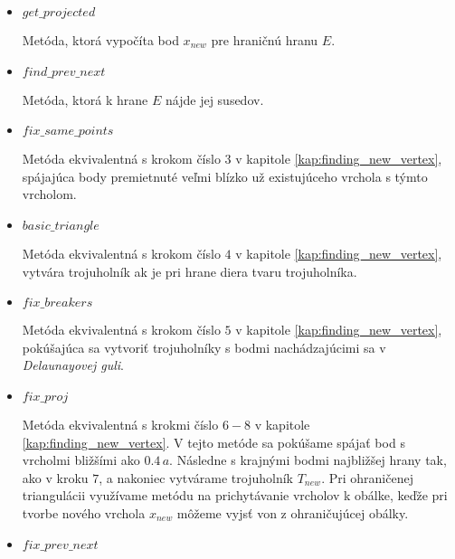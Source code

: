 \begin{itemize}
{\begin{itemize}
{                Metóda, v ktorej sa v správnom poradí volajú ďalšie metódy tak, ako boli opísané v 
                kapitole \ref{kap:finding_new_vertex}.
                Ak sa nám v žiadnej z týchto metód neporadí nájsť nový trojuholník na konci kroku 
                označíme hranu $E = (x_i, x_j)$ za skontrolovanú.
            }
            \item{
                $get\_projected$

                Metóda, ktorá vypočíta bod $x_{new}$ pre hraničnú hranu $E$.
            }
            \item{
                $find\_prev\_next$

                Metóda, ktorá k hrane $E$ nájde jej susedov. 
            }
            \item{
                $fix\_same\_points$

                Metóda ekvivalentná s krokom číslo $3$ v kapitole \ref{kap:finding_new_vertex}, 
                spájajúca body premietnuté veľmi blízko už existujúceho vrchola s týmto vrcholom.
            }
            \item{
                $basic\_triangle$

                Metóda ekvivalentná s krokom číslo $4$ v kapitole \ref{kap:finding_new_vertex},
                vytvára trojuholník ak je pri hrane diera tvaru trojuholníka.
            }
            \item{
                $fix\_breakers$

                Metóda ekvivalentná s krokom číslo $5$ v kapitole \ref{kap:finding_new_vertex},
                pokúšajúca sa vytvoriť trojuholníky s bodmi nachádzajúcimi sa v 
                \textit{Delaunayovej guli}.
            }
            \item{
                $fix\_proj$

                Metóda ekvivalentná s krokmi číslo $6-8$ v kapitole \ref{kap:finding_new_vertex}.
                V tejto metóde sa pokúšame spájať bod s vrcholmi bližšími ako $0.4 \, a$. Následne 
                s krajnými bodmi najbližšej hrany tak, ako v kroku $7$, a nakoniec vytvárame 
                trojuholník $T_{new}$. Pri ohraničenej triangulácii využívame
                metódu na prichytávanie vrcholov
                k obálke, keďže pri tvorbe nového vrchola $x_{new}$ môžeme vyjsť von z 
                ohraničujúcej obálky.
            }
            \item{
                $fix\_prev\_next$

}
\end{itemize}}
\end{itemize}
